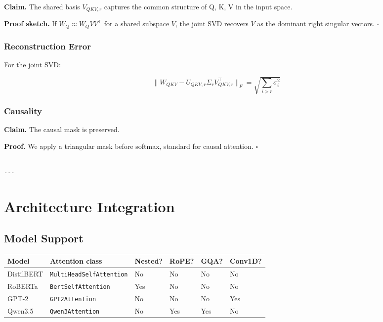 \textbf{Claim.} The shared basis $V_{QKV, r}$ captures the common structure of Q, 
K, V in the input space.

\textbf{Proof sketch.} If $W_Q \approx W_Q V V^\top$ for a shared subspace $V$, the 
joint SVD recovers $V$ as the dominant right singular vectors. $\square$

\subsubsection{Reconstruction Error}

For the joint SVD:

\[
\|W_{QKV} - U_{QKV, r} \Sigma_r V_{QKV, r}^\top\|_F = \sqrt{\sum_{i > r} \sigma_i^2}
\]

\subsubsection{Causality}

\textbf{Claim.} The causal mask is preserved.

\textbf{Proof.} We apply a triangular mask before softmax, standard for causal 
attention. $\square$
\begin{lstlisting}

---
\end{lstlisting}

\section{Architecture Integration}

\subsection{Model Support}

\begin{table}[H]
\centering
\small
\begin{tabular}{llllll}
\toprule
\textbf{Model} & \textbf{Attention class} & \textbf{Nested?} & \textbf{RoPE?} & \textbf{GQA?} & \textbf{Conv1D?} \\
\midrule
DistilBERT & \texttt{MultiHeadSelfAttention} & No & No & No & No \\
RoBERTa & \texttt{BertSelfAttention} & Yes & No & No & No \\
GPT-2 & \texttt{GPT2Attention} & No & No & No & Yes \\
Qwen3.5 & \texttt{Qwen3Attention} & No & Yes & Yes & No \\
\bottomrule
\end{tabular}
\end{table}

